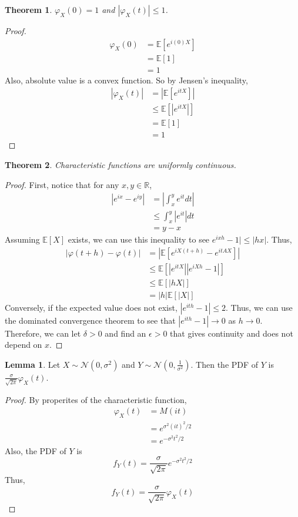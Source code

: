 \documentclass{article}
\newtheorem{theorem}{Theorem}
\theoremstyle{definition}\newtheorem{definition}{DEF}
\theoremstyle{lemma}\newtheorem{lemma}{Lemma}
\theoremstyle{corrolary}\newtheorem{corrolary}{Cor}
\begin{document}
\begin{theorem}
$\varphi_X(0)=1$ and $|\varphi_X(t)|\leq 1$.
\end{theorem}
\begin{proof}
\begin{align*}
\varphi_X(0)&=\mathbb{E}[e^{i(0)X}]\\
&=\mathbb{E}[1]\\
&=1
\end{align*}
Also, absolute value is a convex function.
So by Jensen's inequality,
\begin{align*}
|\varphi_X (t)|&=|\mathbb{E}[e^{itX}]|\\
&\leq \mathbb{E}[|e^{itX}|]\\
&=\mathbb{E}[1]\\
&=1
\end{align*}
\end{proof}

\begin{theorem}
Characteristic functions are uniformly continuous.
\end{theorem}
\begin{proof}
First, notice that for any $x,y\in \mathbb{R}$,
\begin{align*}
|e^{ix}-e^{iy}|&=|\int_x^y e^{it}dt|\\
&\leq \int_x^y |e^{it}| dt\\
&= y-x
\end{align*}
Assuming $\mathbb{E}[X]$ exists, we can use this inequality to see $e^{ixh}-1|\leq |hx|$.
Thus,
\begin{align*}
|\varphi(t+h)-\varphi(t)|&=|\mathbb{E}[e^{iX(t+h)}-e^{itAX}]|\\
&\leq \mathbb{E}[|e^{itX}||e^{iXh}-1|]\\
&\leq \mathbb{E}[|hX|]\\
&=|h|\mathbb{E}[|X|]
\end{align*}
Conversely, if the expected value does not exist, $|e^{ith}-1|\leq 2$.
Thus, we can use the dominated convergence theorem to see that $|e^{ith}-1| \rightarrow 0$ as $h\rightarrow 0$.
Therefore, we can let $\delta>0$ and find an $\epsilon>0$ that gives continuity and does not depend on $x$.
\end{proof}

\begin{lemma}
Let $X\sim \mathcal{N}(0, \sigma^2)$ and $Y\sim \mathcal{N}(0, \frac{1}{\sigma^2})$.
Then the PDF of $Y$ is $\frac{\sigma}{\sqrt{2\pi}} \varphi_X (t)$.
\end{lemma}
\begin{proof}
By properites of the characteristic function,
\begin{align*}
\varphi_X(t) &= M(it)\\
&=e^{\sigma^2 (it)^2 /2}\\
&= e^{-\sigma^2 t^2 /2}
\end{align*}
Also, the PDF of $Y$ is
\begin{equation*}
f_Y(t)=\frac{\sigma}{\sqrt{2\pi}} e^{-\sigma^2 t^2 /2}
\end{equation*}
Thus,
\begin{equation*}
f_Y(t)=\frac{\sigma}{\sqrt{2\pi}} \varphi_X(t)
\end{equation*}
\end{proof}
\end{document}
